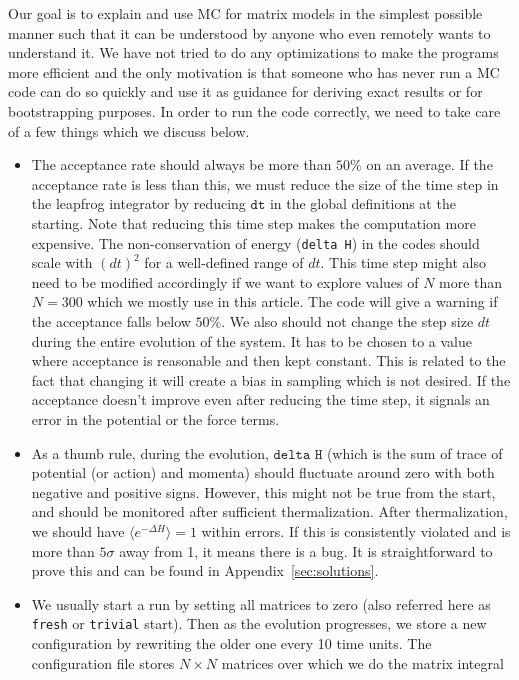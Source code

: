 \documentclass[letter,11pt]{article}
\begin{document}
Our goal is to explain and use MC for matrix models in the simplest possible manner such that it can be understood by anyone who even remotely wants to understand it. 
We have not tried to do any optimizations to make the programs more efficient and the only motivation is that someone who has never run a MC code can do so quickly 
and use it as guidance for deriving exact results or for bootstrapping purposes. In order to run the code correctly, we need to take care of a few things which we
discuss below.  
\begin{itemize} 
\item The acceptance rate should always be more than $50\%$
on an average. If the acceptance rate is less than this, we
must reduce the size of the time step in the leapfrog integrator by reducing 
$\texttt{dt}$ in the global definitions at the starting. Note that 
reducing this time step makes the computation more expensive. 
The non-conservation of energy (\texttt{delta H}) in the codes should scale with $(dt)^2$ for a well-defined range of $dt$. 
This time step might also need to be modified 
accordingly if we want to explore values of $N$ more than $N = 300$ which we mostly use in this article. 
The code will give a warning if the acceptance falls below $50\%$. We also should 
not change the step size $dt$ during the entire evolution of the system. It has to be 
chosen to a value where acceptance is reasonable and then kept constant. This is related to the fact that 
changing it will create a bias in sampling which is not desired. If the acceptance
doesn't improve even after reducing the time step, it signals an error in the potential or the force terms. 
\item As a thumb rule, during the evolution, $\texttt{delta H}$ (which is the sum of
trace of potential (or action) and momenta) should fluctuate around zero
with both negative and positive signs. However, this might not be true from the start, and should
be monitored after sufficient thermalization. After thermalization, we should have 
$\langle e^{-\Delta H} \rangle = 1$ within errors. If this is consistently violated and is more than $5\sigma$ away from 1, it means there is a bug. It is straightforward to prove this and can be found in Appendix~\ref{sec:solutions}.
\item We usually start a run by setting all matrices to zero (also referred here as \texttt{fresh} or 
\texttt{trivial} start). Then as the evolution progresses, we store a new configuration by rewriting the older one every 10 time units. The configuration file stores $N \times N$ matrices over which we do the matrix integral 

\end{itemize}
\end{document}
